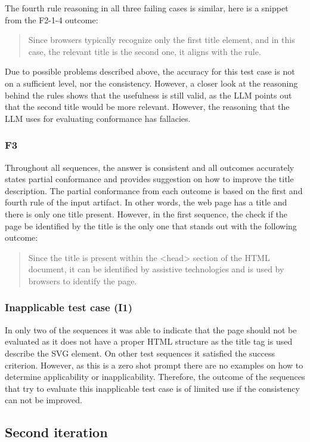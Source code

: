 The fourth rule reasoning in all three failing cases is similar, here is a snippet from the F2-1-4 outcome: \blockquote{Since browsers typically recognize only the first title element, and in this case, the relevant title is the second one, it aligns with the rule.}

Due to possible problems described above, the accuracy for this test case is not on a sufficient level, nor the consistency. However, a closer look at the reasoning behind the rules shows that the usefulness is still valid, as the LLM points out that the second title would be more relevant. However, the reasoning that the LLM uses for evaluating conformance has fallacies.

\subsubsection{F3}

Throughout all sequences, the answer is consistent and all outcomes accurately states partial conformance and provides suggestion on how to improve the title description. The partial conformance from each outcome is based on the first and fourth rule of the input artifact. In other words, the web page has a title and there is only one title present. However, in the first sequence, the check if the page be identified by the title is the only one that stands out with the following outcome: \blockquote{Since the title is present within the <head> section of the HTML document, it can be identified by assistive technologies and is used by browsers to identify the page.}

\subsubsection{Inapplicable test case (I1)}

In only two of the sequences it was able to indicate that the page should not be evaluated as it does not have a proper HTML structure as the title tag is used describe the SVG element. On other test sequences it satisfied the success criterion. However, as this is a zero shot prompt there are no examples on how to determine applicability or inapplicability. Therefore, the outcome of the sequences that try to evaluate this inapplicable test case is of limited use if the consistency can not be improved.

\subsection{Second iteration}

